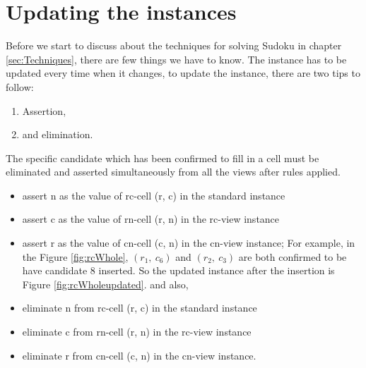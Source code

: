 \documentclass[11pt]{report}
\begin{document}
\section{Updating the instances}
\label{sec:Updatingtheinstances}

Before we start to discuss about the techniques for solving Sudoku in chapter \ref{sec:Techniques}, there are few things we have to know. The instance has to be updated every time when it changes, to update the instance, there are two tips to follow:
\begin{enumerate}
\item Assertion,
\item and elimination.
\end{enumerate}

The specific candidate which has been confirmed to fill in a cell must be eliminated and asserted simultaneously from all the views after rules applied.
\begin{itemize}
\item assert n as the value of rc-cell (r, c) in the standard instance
\item assert c as the value of rn-cell (r, n) in the rc-view instance
\item assert r as the value of cn-cell (c, n) in the cn-view instance;
For example, in the Figure \ref{fig:rcWhole}, $(r_{1},\ c_{6})$ and $(r_{2},\ c_{3})$ are both confirmed to be have candidate 8 inserted. So the updated instance after the insertion is Figure \ref{fig:rcWholeupdated}. 
and also,
\item eliminate n from rc-cell (r, c) in the standard instance
\item eliminate c from rn-cell (r, n) in the rc-view instance
\item eliminate r from cn-cell (c, n) in the cn-view instance.
\end{itemize}
\end{document}
